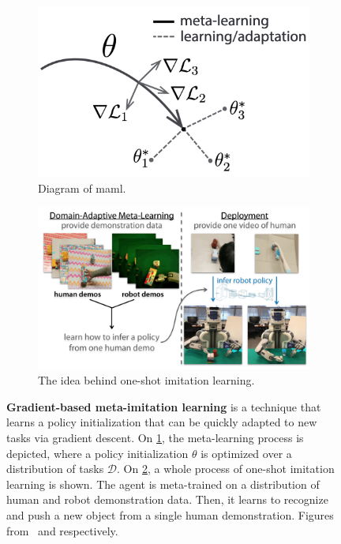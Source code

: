 \begin{figure}
    \centering
   \begin{subfigure}[b]{0.49\linewidth}
        \centering
        \includegraphics[width=\linewidth]{figures/related_work/maml}
        \caption{Diagram of \acrfull{maml}.}
        \label{fig:maml}
    \end{subfigure}
    \hfill
    \begin{subfigure}[b]{0.49\linewidth}
        \centering
        \includegraphics[width=\linewidth]{figures/related_work/one_shot_human}
        \caption{The idea behind one-shot imitation learning.}
        \label{fig:oneshot-human}
    \end{subfigure}
    \caption[Gradient-based meta-imitation learning]{\textbf{Gradient-based meta-imitation learning} is a technique that learns a policy initialization that can be quickly adapted to new tasks via gradient descent.
    On \ref{fig:maml}, the meta-learning process is depicted, where a policy initialization $\theta$ is optimized over a distribution of tasks $\mathcal{D}$.
    On \ref{fig:oneshot-human}, a whole process of one-shot imitation learning is shown.
    The agent is meta-trained on a distribution of human and robot demonstration data.
    Then, it learns to recognize and push a new object from a single human demonstration.
    Figures from~\cite{finn2017} and \cite{Yu2018OneShotIF} respectively.}
    \label{fig:maml-mil}
\end{figure}

